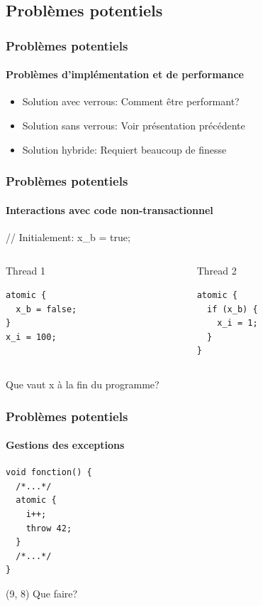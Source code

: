 \documentclass{beamer}
\begin{document}
\subsection{Problèmes potentiels}
\begin{frame}
\frametitle{Problèmes potentiels}
\framesubtitle{Problèmes d'implémentation et de performance}
\begin{itemize}
\item Solution avec verrous: Comment être performant?
\item Solution sans verrous: Voir présentation précédente
\item Solution hybride: Requiert beaucoup de finesse
\end{itemize}
\end{frame}

\begin{frame}[fragile]
\frametitle{Problèmes potentiels}
\framesubtitle{Interactions avec code non-transactionnel}
\begin{center}
// Initialement: x\_b = true;
\end{center}
\begin{columns}
    \begin{column}{0.5\textwidth}
    Thread 1
        \begin{lstlisting}        
atomic {
  x_b = false;
}
x_i = 100;
        \end{lstlisting}
    \end{column}
    \begin{column}{0.5\textwidth}
    Thread 2
        \begin{lstlisting}        
atomic {
  if (x_b) {
    x_i = 1;
  }
}
        \end{lstlisting}
    \end{column}
\end{columns}
\begin{center}
Que vaut x à la fin du programme?
\end{center}
\end{frame}

\begin{frame}[fragile]
\frametitle{Problèmes potentiels}
\framesubtitle{Gestions des exceptions}
\begin{lstlisting}
void fonction() {
  /*...*/
  atomic {
    i++;
    throw 42;
  }
  /*...*/
}
\end{lstlisting}

\begin{textblock}{5}(9, 8)
	 \huge{Que faire?}
\end{textblock}
\end{frame}
\end{document}
